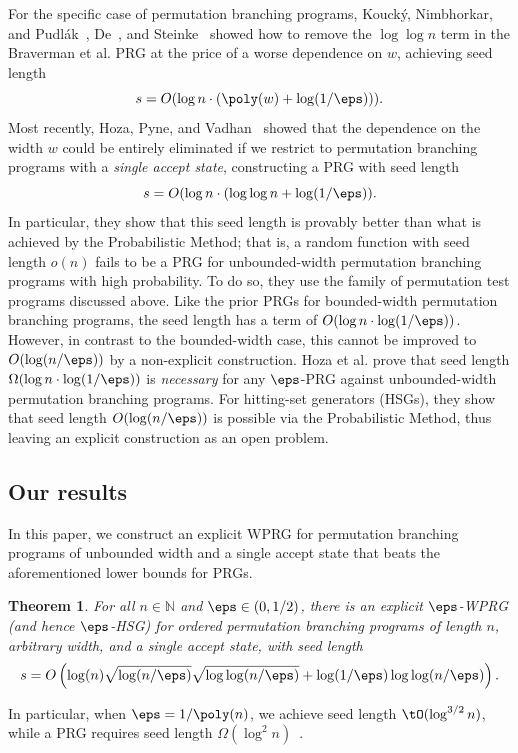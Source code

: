 \documentclass[11pt]{article}
\newtheorem{theorem}{Theorem}[section]
\newcommand{\N}{{\mathbb N}}
\begin{document}
	For the specific case of permutation branching programs, Kouck{\'y}, Nimbhorkar, and Pudl{\'a}k~\cite{KouckyNiPu11}, De~\cite{De11}, and Steinke~\cite{Steinke12}
	showed how to remove the $\log\log n$ term in the Braverman et al. PRG at the price of a worse dependence on $w$, achieving seed length
	$$s=O(\log n\cdot(\poly(w)+\log(1/\eps))).$$
	Most recently, Hoza, Pyne, and Vadhan~\cite{HozaPyVa21} showed that the dependence on the width $w$ could be entirely eliminated if we restrict to permutation branching programs with a \emph{single accept state}, constructing a PRG with seed length
	$$s=O(\log n\cdot (\log\log n+\log(1/\eps)).$$
	In particular, they show that this	seed length is provably better than what is achieved by the Probabilistic Method; that is, a random function with seed length $o(n)$ fails to be a PRG for unbounded-width permutation branching programs with high probability. To do so, they use the family of permutation test programs discussed above.
	Like the prior PRGs for bounded-width permutation branching programs, the seed length has a term of $O(\log n\cdot \log(1/\eps))$.  However, in contrast to the bounded-width case, this cannot be improved to $O(\log(n/\eps))$ by a non-explicit construction.  Hoza et al. prove that seed length $\Omega(\log n \cdot \log(1/\eps))$ is \emph{necessary} for any $\eps$-PRG against unbounded-width permutation branching programs.  For hitting-set generators (HSGs), they show that seed length $O(\log(n/\eps))$ is possible via the Probabilistic Method, thus leaving an explicit construction as an open problem. 
	
\subsection{Our results}
In this paper, we construct an explicit WPRG for permutation branching programs of unbounded width and a single accept state that beats the aforementioned lower bounds for PRGs. %


\begin{theorem}
\label{thm:cycle}
For all $n\in \N$ and $\eps \in (0,1/2)$, there is an explicit $\eps$-WPRG (and hence $\eps$-HSG) for ordered permutation branching 
programs of length $n$, arbitrary width, and a single accept state, with seed length
$$s=O\left(\log(n)\sqrt{\log(n/\eps)}\sqrt{\log\log(n/\eps)}+\log(1/\eps)\log\log(n/\eps)\right).$$
\end{theorem}

In particular, when $\eps=1/\poly(n)$, we achieve seed length $\tO(\log^{3/2} n)$, while
a PRG requires seed length $\Omega(\log^2 n)$~\cite{HozaPyVa21}.
\end{document}
